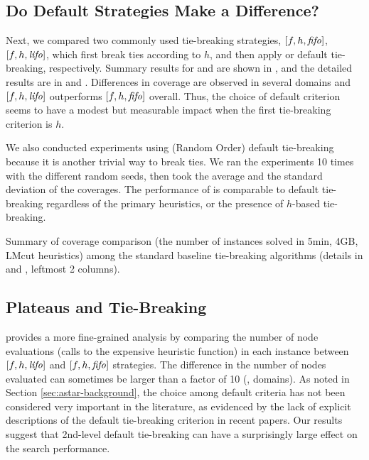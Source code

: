 \subsection{Do Default Strategies Make a Difference?}

Next, we  compared two commonly used tie-breaking strategies, $[f,h,{\text{\textit{fifo}}}]$, $[f,h,{\text{\textit{lifo}}}]$, which
first break ties according to $h$, and then apply \fifo or \lifo
default tie-breaking, respectively.
Summary results for \lmcut and \mands are
shown in , and the detailed results are in  and .
Differences in coverage are observed in several domains and $[f,h,{\text{\textit{lifo}}}]$ outperforms $[f,h,{\text{\textit{fifo}}}]$ overall. Thus, the choice of default criterion seems to have a modest but measurable impact when the first tie-breaking criterion is $h$.

We also conducted experiments using \ro (Random Order) default tie-breaking because it is another trivial way to
break ties. We ran the experiments 10 times with the different random seeds, then took the average and the
standard deviation of the coverages. The performance of \ro is comparable to \fifo default tie-breaking regardless
of the primary heuristics, or the presence of $h$-based tie-breaking.

\begin{table}[htbp]
 {
 \centering
 
 \caption{
 Summary of coverage comparison (the number of instances solved in 5min, 4GB, LMcut
 heuristics) among
 the standard baseline tie-breaking algorithms (details in  and , leftmost 2 columns). 
 }
 \label{tbl:summary-std}
 }
\end{table}

\subsection{Plateaus and Tie-Breaking}

 provides a
more fine-grained analysis by comparing the number of node evaluations
(calls to the expensive \lmcut heuristic function) in each instance between $[f,h,{\text{\textit{lifo}}}]$ and $[f,h,{\text{\textit{fifo}}}]$ strategies.
The difference in the number of nodes
evaluated can sometimes be larger than a factor of 10 (,  domains).
As noted in Section \ref{sec:astar-background}, the choice among default criteria has not been considered very important in the literature, as evidenced by the lack of explicit descriptions of the default tie-breaking criterion in recent papers. 
Our results suggest that 2nd-level default tie-breaking can have a surprisingly large effect on
the search performance.

